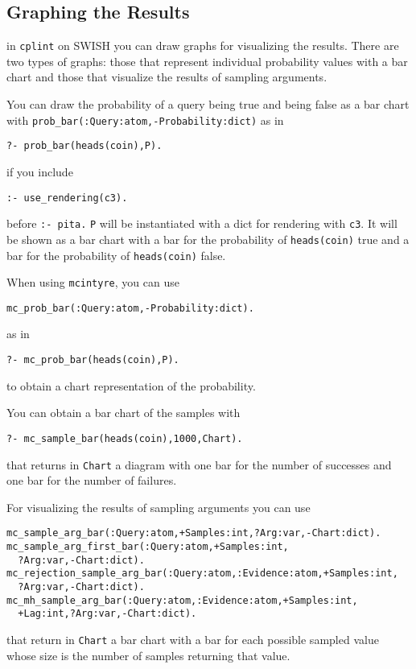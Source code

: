 \subsection{Graphing the Results}
\label{condqcont}

in \texttt{cplint} on SWISH you can draw graphs
for visualizing the results. There are two types 
of graphs: those that represent individual probability values with a bar chart and those that 
visualize the results of sampling arguments.

You can draw the probability of a query being true and 
being false as a bar chart with \verb|prob_bar(:Query:atom,-Probability:dict)| as in
\begin{verbatim}
?- prob_bar(heads(coin),P).
\end{verbatim}
if you include
\begin{verbatim}
:- use_rendering(c3).
\end{verbatim}
before \verb|:- pita.| \verb|P| will be instantiated with a
dict for rendering with \verb|c3|. It will be shown as a bar chart with
a bar for the probability of \verb|heads(coin)| true and a bar for the probability of \verb|heads(coin)| false.


When using \verb|mcintyre|, you can use
\begin{verbatim}
mc_prob_bar(:Query:atom,-Probability:dict).
\end{verbatim}
as in
\begin{verbatim}
?- mc_prob_bar(heads(coin),P).
\end{verbatim}
to obtain a chart representation of the probability.

You can obtain a bar chart of the samples with
\begin{verbatim}
?- mc_sample_bar(heads(coin),1000,Chart).
\end{verbatim}
that returns in \verb|Chart| a diagram with one bar for the number of successes and 
one bar for the number of failures.

For visualizing the results of sampling arguments you can use
\begin{verbatim}
mc_sample_arg_bar(:Query:atom,+Samples:int,?Arg:var,-Chart:dict).
mc_sample_arg_first_bar(:Query:atom,+Samples:int,
  ?Arg:var,-Chart:dict).
mc_rejection_sample_arg_bar(:Query:atom,:Evidence:atom,+Samples:int,
  ?Arg:var,-Chart:dict).
mc_mh_sample_arg_bar(:Query:atom,:Evidence:atom,+Samples:int,
  +Lag:int,?Arg:var,-Chart:dict).
\end{verbatim} 
that return in \verb|Chart| a bar chart with a bar for each possible sampled value whose size is the number of samples
returning that value.

